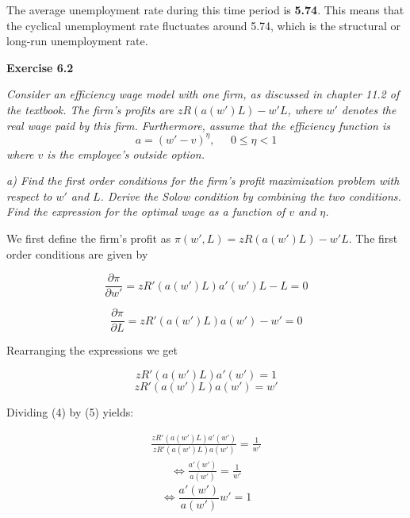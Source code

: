 \documentclass[11pt]{article} %
\begin{document}
The average unemployment rate during this time period is \textbf{5.74}. This means that the cyclical unemployment rate fluctuates around 5.74, which is the structural or long-run unemployment rate.







\pagebreak
\textbf{\Large{Exercise 6.2}}

\textit{Consider an efficiency wage model with one firm, as discussed in chapter 11.2
of the textbook. The firm's profits are $zR\left(a(w')L\right)-w'L$, where $w'$ denotes the real wage paid by this firm. Furthermore, assume that the efficiency function is}
\begin{equation}
    a=(w'-v)^{\eta}, \;\;\;\;\; 0\leq\eta<1
\end{equation}
\textit{where $v$ is the employee's outside option.}

\textit{a) Find the first order conditions for the firm's profit maximization problem with respect to $w'$ and $L$. Derive the Solow condition by combining the two conditions. Find the expression for the optimal wage as a function of $v$ and $\eta$.}\par

\bigskip
We first define the firm's profit as $\pi(w',L)=zR\left(a(w')L\right)-w'L$. The first order conditions are given by

\bigskip
\begin{equation}
    \frac{\partial \pi}{\partial w'} = zR'\left(a(w')L\right) a'(w')L - L = 0    
\end{equation}

\begin{equation}
    \frac{\partial \pi}{\partial L} = zR'\left(a(w')L\right) a(w') - w' = 0    
\end{equation}

\bigskip
Rearranging the expressions we get

\bigskip
\begin{equation}
    zR'\left(a(w')L\right)a'(w') = 1
\end{equation}
\begin{equation}
    zR'\left(a(w')L\right)a(w') = w'
\end{equation}

\pagebreak
Dividing (4) by (5) yields:

\bigskip
\begin{align*}
    \frac{zR'\left(a(w')L\right)a'(w')}{zR'\left(a(w')L\right)a(w')} = \frac{1}{w'}
\end{align*}
\begin{align*}
    \Longleftrightarrow \frac{a'(w')}{a(w')} = \frac{1}{w'}
\end{align*}
\begin{equation}
    \Longleftrightarrow \frac{a'(w')}{a(w')}w' = 1
\end{equation}
\end{document}
